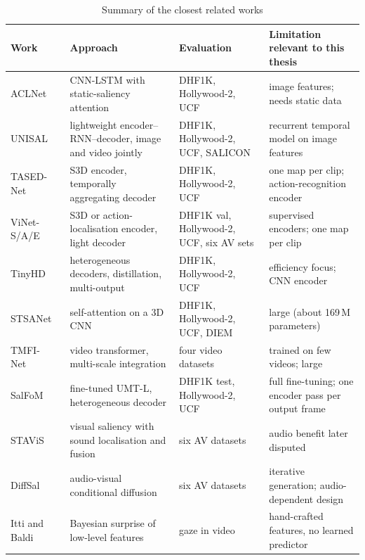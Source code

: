 \begin{table}[htbp]
  \centering
  \caption{Summary of the closest related works}\label{tab:related}
  \footnotesize
  \begin{tabularx}{\textwidth}{@{}>{\raggedright}p{2.7cm}>{\raggedright}X>{\raggedright}p{2.6cm}
                                   >{\raggedright\arraybackslash}X@{}}
    \toprule
    \textbf{Work} & \textbf{Approach} & \textbf{Evaluation}
      & \textbf{Limitation relevant to this thesis} \\
    \midrule
    ACLNet~\cite{wang2021revisiting} & \acrshort{CNN}-\acrshort{LSTM} with static-saliency attention & DHF1K, Hollywood-2, UCF
      & image features; needs static data \\
    UNISAL~\cite{droste2020unified} & lightweight encoder--\acrshort{RNN}--decoder, image and video jointly
      & DHF1K, Hollywood-2, UCF, SALICON & recurrent temporal model on image features \\
    TASED-Net~\cite{min2019tased} & S3D encoder, temporally aggregating decoder & DHF1K, Hollywood-2, UCF
      & one map per clip; action-recognition encoder \\
    ViNet-S/A/E~\cite{girmaji2025minimalistic} & S3D or action-localisation encoder, light decoder
      & DHF1K val, Hollywood-2, UCF, six \acrshort{AV} sets & supervised encoders; one map per clip \\
    TinyHD~\cite{hu2023tinyhd} & heterogeneous decoders, distillation, multi-output
      & DHF1K, Hollywood-2, UCF & efficiency focus; \acrshort{CNN} encoder \\
    STSANet~\cite{wang2023spatio} & self-attention on a 3D \acrshort{CNN} & DHF1K, Hollywood-2, UCF, DIEM
      & large (about 169\,M parameters) \\
    TMFI-Net~\cite{zhou2023transformer} & video transformer, multi-scale integration
      & four video datasets & trained on few videos; large \\
    SalFoM~\cite{moradi2024salfom} & fine-tuned \acrshort{UMT}-L, heterogeneous decoder & DHF1K test, Hollywood-2, UCF
      & full fine-tuning; one encoder pass per output frame \\
    STAViS~\cite{tsiami2020stavis} & visual saliency with sound localisation and fusion & six \acrshort{AV} datasets
      & audio benefit later disputed~\cite{agrawal2022does} \\
    DiffSal~\cite{xiong2024diffsal} & audio-visual conditional diffusion & six \acrshort{AV} datasets
      & iterative generation; audio-dependent design \\
    Itti and Baldi~\cite{itti2009bayesian} & Bayesian surprise of low-level features & gaze in video
      & hand-crafted features, no learned predictor \\
    \bottomrule
  \end{tabularx}
\end{table}

